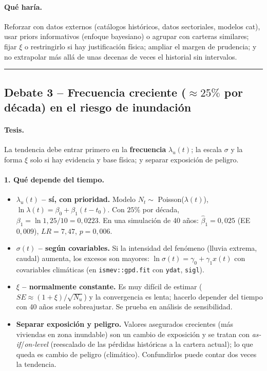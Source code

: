 \documentclass[a4paper,12pt]{article}
\begin{document}
\paragraph{Qu\'e har\'ia.} Reforzar con datos externos (cat\'alogos hist\'oricos, datos sectoriales, modelos cat), usar priors informativos (enfoque bayesiano) o agrupar con carteras similares; fijar $\xi$ o restringirlo si hay justificaci\'on f\'isica; ampliar el margen de prudencia; y no extrapolar m\'as all\'a de unas decenas de veces el historial sin intervalos.

\bigskip\hrule\bigskip

\subsection{Debate 3 -- Frecuencia creciente ($\approx25\%$ por d\'ecada) en el riesgo de inundaci\'on}

\paragraph{Tesis.} La tendencia debe entrar primero en la \textbf{frecuencia} $\lambda_u(t)$; la escala $\sigma$ y la forma $\xi$ solo si hay evidencia y base f\'isica; y separar exposici\'on de peligro.

\paragraph{1. Qu\'e depende del tiempo.}
\begin{itemize}[leftmargin=*,itemsep=2pt]
\item \textbf{$\lambda_u(t)$ -- s\'i, con prioridad.} Modelo $N_t\sim$ Poisson($\lambda(t)$), $\ln\lambda(t)=\beta_0+\beta_1(t-t_0)$. Con $25\%$ por d\'ecada, $\beta_1=\ln1{,}25/10=0{,}0223$. En una simulaci\'on de 40 a\~nos: $\hat\beta_1=0{,}025$ (EE $0{,}009$), $LR=7{,}47$, $p=0{,}006$.
\item \textbf{$\sigma(t)$ -- seg\'un covariables.} Si la intensidad del fen\'omeno (lluvia extrema, caudal) aumenta, los excesos son mayores: $\ln\sigma(t)=\gamma_0+\gamma_1 x(t)$ con covariables clim\'aticas (en \texttt{ismev::gpd.fit} con \texttt{ydat}, \texttt{sigl}).
\item \textbf{$\xi$ -- normalmente constante.} Es muy dif\'icil de estimar ($SE\approx(1+\xi)/\sqrt{N_u}$) y la convergencia es lenta; hacerlo depender del tiempo con 40 a\~nos suele sobreajustar. Se prueba en an\'alisis de sensibilidad.
\item \textbf{Separar exposici\'on y peligro.} Valores asegurados crecientes (más viviendas en zona inundable) son un cambio de exposici\'on y se tratan con \emph{as-if}/\emph{on-level} (reescalado de las p\'erdidas hist\'oricas a la cartera actual); lo que queda es cambio de peligro (clim\'atico). Confundirlos puede contar dos veces la tendencia.
\end{itemize}
\end{document}
